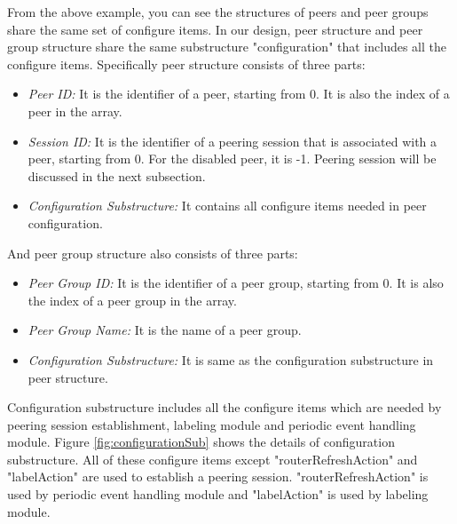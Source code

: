 From the above example, you can see the structures of peers and peer groups share the same set of configure items. In our design, peer structure and peer group structure share the same substructure "configuration" that includes all the configure items.  
Specifically peer structure consists of three parts:
\begin{itemize}
\item{\emph{Peer ID:}  It is the identifier of a peer, starting from 0. It is also the index of a peer in the array.} 

\item{\emph{Session ID:} It is  the identifier of a peering session that is associated with a peer, starting from 0. For the disabled peer, it is -1. Peering session will be discussed in the next subsection.}

\item{\emph{Configuration Substructure:} It contains all configure items needed in peer configuration.}  
\end{itemize}
And peer group structure also consists of three parts:
\begin{itemize}
\item{\emph{Peer Group ID:}  It is the identifier of a peer group, starting from 0. It is also the index of a peer group in the array.} 

\item{\emph{Peer Group Name:} It is the name of a peer group.}

\item{\emph{Configuration Substructure:} It is same as the configuration substructure in peer structure.}  
\end{itemize}
Configuration substructure includes all the configure items which are needed by peering session establishment, labeling module and periodic event handling module. Figure \ref{fig:configurationSub} shows the details of configuration substructure. All of these configure items except "routerRefreshAction" and "labelAction" are used to establish a peering session. "routerRefreshAction" is used by periodic event handling module and "labelAction" is used by labeling module.
